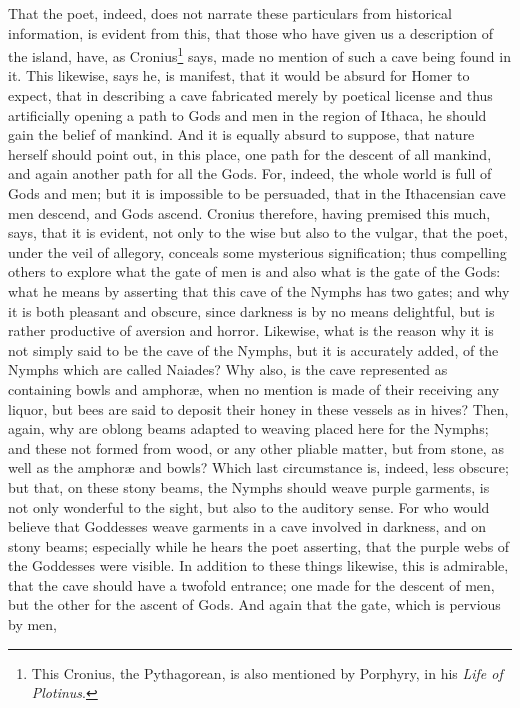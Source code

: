 \documentclass[a4paper,12pt]{article}
\begin{document}
\noindent That the poet, indeed, does not narrate these particulars from
historical information, is evident from this, that those who have given us a
description of the island, have, as Cronius\footnote{This Cronius, the
Pythagorean, is also mentioned by Porphyry, in his \textit{Life of Plotinus}.}
says, made no mention of such a cave being found in it. This likewise, says he,
is manifest, that it would be absurd for Homer to expect, that in describing a
cave fabricated merely by poetical license and thus artificially opening a path
to Gods and men in the region of Ithaca, he should gain the belief of mankind.
And it is equally absurd to suppose, that nature herself should point out, in
this place, one path for the descent of all mankind, and again another path for
all the Gods. For, indeed, the whole world is full of Gods and men; but it is
impossible to be persuaded, that in the Ithacensian cave men descend, and Gods
ascend. Cronius therefore, having premised this much, says, that it is
evident, not only to the wise but also to the vulgar, that the poet, under the
veil of allegory, conceals some mysterious signification; thus compelling
others to explore what the gate of men is and also what is the gate of the
Gods: what he means by asserting that this cave of the Nymphs has two gates;
and why it is both pleasant and obscure, since darkness is by no means
delightful, but is rather productive of aversion and horror. Likewise, what is
the reason why it is not simply said to be the cave of the Nymphs, but it is
accurately added, of the Nymphs which are called Naiades? Why also, is the cave
represented as containing bowls and amphor{\ae}, when no mention is made of
their receiving any liquor, but bees are said to deposit their honey in these
vessels as in hives? Then, again, why are oblong beams adapted to weaving
placed here for the Nymphs; and these not formed from wood, or any other
pliable matter, but from stone, as well as the amphor{\ae} and bowls? Which
last circumstance is, indeed, less obscure; but that, on these stony beams, the
Nymphs should weave purple garments, is not only wonderful to the sight, but
also to the auditory sense. For who would believe that Goddesses weave
garments in a cave involved in darkness, and on stony beams; especially while
he hears the poet asserting, that the purple webs of the Goddesses were
visible. In addition to these things likewise, this is admirable, that the cave
should have a twofold entrance; one made for the descent of men, but the other
for the ascent of Gods. And again that the gate, which is pervious by men,
\end{document}
